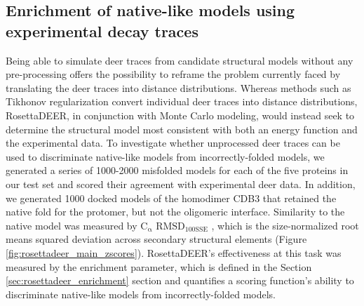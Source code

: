 \subsection{Enrichment of native-like models using experimental decay traces}

Being able to simulate \gls{deer} traces from candidate structural models without any pre-processing offers the possibility to reframe the problem currently faced by translating the \gls{deer} traces into distance distributions. Whereas methods such as Tikhonov regularization convert individual \gls{deer} traces into distance distributions, RosettaDEER, in conjunction with Monte Carlo modeling, would instead seek to determine the structural model most consistent with both an energy function and the experimental data. To investigate whether unprocessed \gls{deer} traces can be used to discriminate native-like models from incorrectly-folded models, we generated a series of 1000-2000 misfolded models for each of the five proteins in our test set and scored their agreement with experimental \gls{deer} data. In addition, we generated 1000 docked models of the homodimer CDB3 that retained the native fold for the protomer, but not the oligomeric interface. Similarity to the native model was measured by $\mathrm{C_{\upalpha}}$ $\mathrm{RMSD_{100SSE}}$ \citep*{Carugo2002}, which is the size-normalized root means squared deviation across secondary structural elements (Figure \ref{fig:rosettadeer_main_zscores}). RosettaDEER’s effectiveness at this task was measured by the enrichment parameter, which is defined in the Section \ref{sec:rosettadeer_enrichment} section and quantifies a scoring function’s ability to discriminate native-like models from incorrectly-folded models.

